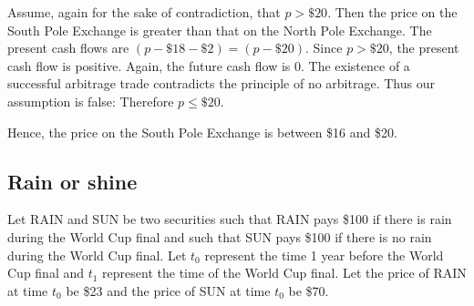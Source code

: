 \documentclass[12pt]{article}
\begin{document}
\begin{enumerate}
Assume, again for the sake of contradiction, that $p>\$20$. Then the price on the South Pole Exchange is greater than that on the North Pole Exchange. The present cash flows are $(p-\$18-\$2)=(p-\$20)$. Since $p>\$20$, the present cash flow is positive. Again, the future cash flow is 0. The existence of a successful arbitrage trade contradicts the principle of no arbitrage. Thus our assumption is false: Therefore $p\leq\$20$.

Hence, the price on the South Pole Exchange is between \$16 and \$20.
\end{enumerate}
\subsection{Rain or shine}
Let \textsc{RAIN} and \textsc{SUN} be two securities such that RAIN pays \$100 if there is rain during the World Cup final and such that SUN pays \$100 if there is no rain during the World Cup final. Let $t_0$ represent the time 1 year before the World Cup final and $t_1$ represent the time of the World Cup final. Let the price of \textsc{RAIN} at time $t_0$ be \$23 and the price of \textsc{SUN} at time $t_0$ be \$70.
\end{document}
